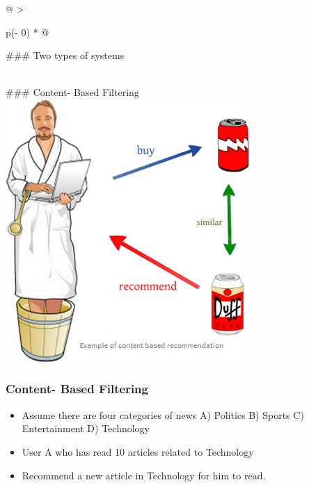 \documentclass[
]{article}
\begin{document}
\begin{longtable}[]{@{}
  >{\raggedright\arraybackslash}p{(\columnwidth - 0\tabcolsep) * }@{}}
\toprule
\begin{minipage}[b]{\linewidth}\raggedright
\#\#\# Two types of systems
\end{minipage} \\
\midrule
\endhead
\#\#\# Content- Based Filtering \\
\includegraphics{images/rs5.png} \\
\bottomrule
\end{longtable}

\hypertarget{content--based-filtering}{%
\subsubsection{Content- Based
Filtering}\label{content--based-filtering}}

\begin{itemize}
\item
  Assume there are four categories of news A) Politics B) Sports C)
  Entertainment D) Technology
\item
  User A who has read 10 articles related to Technology
\item
  Recommend a new article in Technology for him to read.
\end{itemize}
\end{document}
